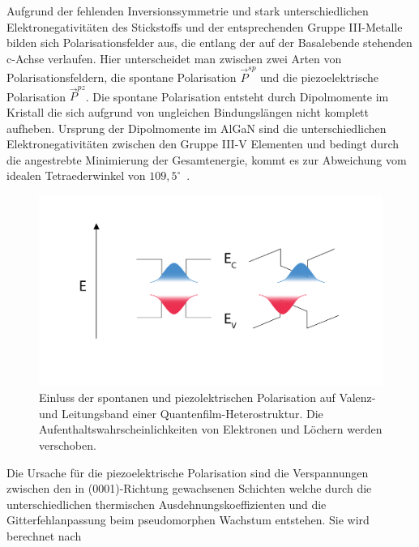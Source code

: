 Aufgrund der fehlenden Inversionssymmetrie und stark unterschiedlichen Elektronegativitäten des Stickstoffs und der entsprechenden Gruppe III-Metalle bilden sich Polarisationsfelder aus, die entlang der auf der Basalebende stehenden c-Achse verlaufen. Hier unterscheidet man zwischen zwei Arten von Polarisationsfeldern, die spontane Polarisation $ \vec{P}^{sp} $ und die piezoelektrische Polarisation $ \vec{P}^{pz} $.
\newline\newline
Die spontane Polarisation entsteht durch Dipolmomente im Kristall die sich aufgrund von ungleichen Bindungslängen nicht komplett aufheben. Ursprung der 
Dipolmomente im AlGaN sind die unterschiedlichen Elektronegativitäten zwischen den Gruppe III-V Elementen und bedingt durch die angestrebte Minimierung der Gesamtenergie, kommt es zur Abweichung vom idealen Tetraederwinkel von $109,5^{\circ}$~\cite{ambacher2002}.
%
\begin{figure}[htb]
    \centering
    \begin{minipage}[t]{0.7\linewidth}
        \centering
        \includegraphics[width=\linewidth]{Bilder/QCSE.pdf}
        \caption{Einluss der spontanen und piezolektrischen Polarisation auf Valenz- und Leitungsband einer Quantenfilm-Heterostruktur. Die Aufenthaltswahrscheinlichkeiten von Elektronen und Löchern werden verschoben.}
        \label{fig:qcse}
    \end{minipage}%
\end{figure}
\vspace{1cm}
\raggedright
\newpage
Die Ursache für die piezoelektrische Polarisation sind die Verspannungen zwischen den in (0001)-Richtung gewachsenen Schichten welche durch die unterschiedlichen thermischen Ausdehnungskoeffizienten und die Gitterfehlanpassung beim pseudomorphen Wachstum entstehen. Sie wird berechnet nach
